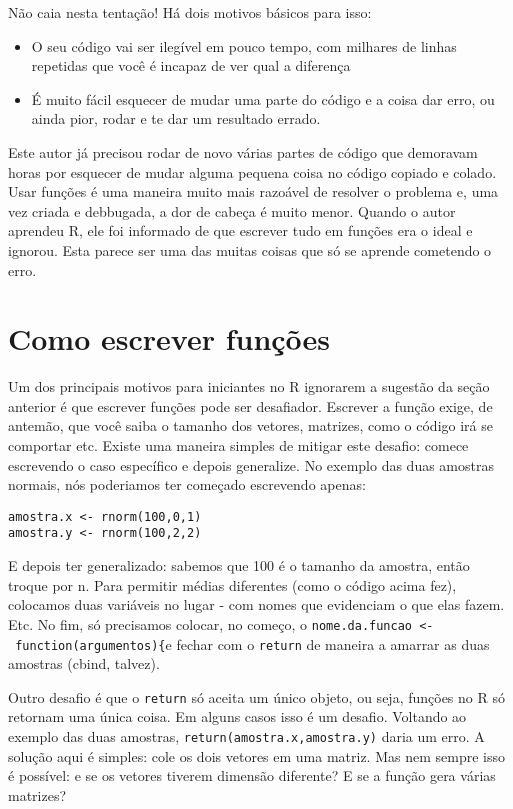 \documentclass[]{book}
\providecommand{\tightlist}{%
  \setlength{\itemsep}{0pt}\setlength{\parskip}{0pt}}
\begin{document}
Não caia nesta tentação! Há dois motivos básicos para isso:

\begin{itemize}
\tightlist
\item
  O seu código vai ser ilegível em pouco tempo, com milhares de linhas
  repetidas que você é incapaz de ver qual a diferença
\item
  É muito fácil esquecer de mudar uma parte do código e a coisa dar
  erro, ou ainda pior, rodar e te dar um resultado errado.
\end{itemize}

Este autor já precisou rodar de novo várias partes de código que
demoravam horas por esquecer de mudar alguma pequena coisa no código
copiado e colado. Usar funções é uma maneira muito mais razoável de
resolver o problema e, uma vez criada e debbugada, a dor de cabeça é
muito menor. Quando o autor aprendeu R, ele foi informado de que
escrever tudo em funções era o ideal e ignorou. Esta parece ser uma das
muitas coisas que só se aprende cometendo o erro.

\section{Como escrever funções}\label{como-escrever-funcoes}

Um dos principais motivos para iniciantes no R ignorarem a sugestão da
seção anterior é que escrever funções pode ser desafiador. Escrever a
função exige, de antemão, que você saiba o tamanho dos vetores,
matrizes, como o código irá se comportar etc. Existe uma maneira simples
de mitigar este desafio: comece escrevendo o caso específico e depois
generalize. No exemplo das duas amostras normais, nós poderiamos ter
começado escrevendo apenas:

\begin{verbatim}
amostra.x <- rnorm(100,0,1)
amostra.y <- rnorm(100,2,2)
\end{verbatim}

E depois ter generalizado: sabemos que 100 é o tamanho da amostra, então
troque por n. Para permitir médias diferentes (como o código acima fez),
colocamos duas variáveis no lugar - com nomes que evidenciam o que elas
fazem. Etc. No fim, só precisamos colocar, no começo, o
\texttt{nome.da.funcao\ \textless{}-\ function(argumentos)\{}e fechar
com o \texttt{return} de maneira a amarrar as duas amostras (cbind,
talvez).

Outro desafio é que o \texttt{return} só aceita um único objeto, ou
seja, funções no R só retornam uma única coisa. Em alguns casos isso é
um desafio. Voltando ao exemplo das duas amostras,
\texttt{return(amostra.x,amostra.y)} daria um erro. A solução aqui é
simples: cole os dois vetores em uma matriz. Mas nem sempre isso é
possível: e se os vetores tiverem dimensão diferente? E se a função gera
várias matrizes?
\end{document}
